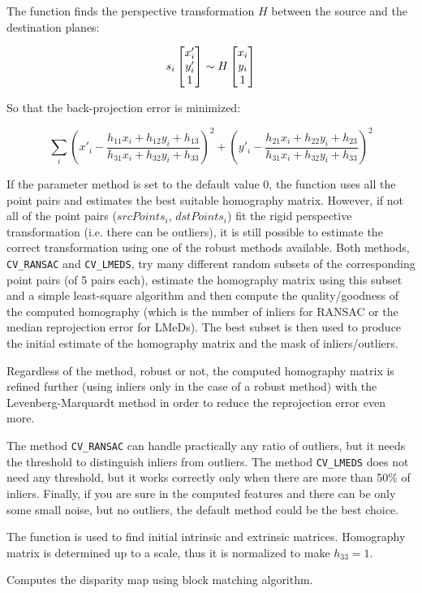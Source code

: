 The function finds the perspective transformation $H$ between the source and the destination planes:

\[
s_i \begin{bmatrix} x'_i\\ y'_i\\ 1 \end{bmatrix} \sim H \begin{bmatrix} x_i\\ y_i\\ 1 \end{bmatrix}
\]

So that the back-projection error is minimized:

\[
\sum_i
\left( x'_i-\frac{h_{11} x_i + h_{12} y_i + h_{13}}{h_{31} x_i + h_{32} y_i + h_{33}} \right)^2+
\left( y'_i-\frac{h_{21} x_i + h_{22} y_i + h_{23}}{h_{31} x_i + h_{32} y_i + h_{33}} \right)^2
\]

If the parameter method is set to the default value 0, the function
uses all the point pairs and estimates the best suitable homography
matrix. However, if not all of the point pairs ($srcPoints_i$,
$dstPoints_i$) fit the rigid perspective transformation (i.e. there
can be outliers), it is still possible to estimate the correct
transformation using one of the robust methods available. Both
methods, \texttt{CV\_RANSAC} and \texttt{CV\_LMEDS}, try many different random subsets
of the corresponding point pairs (of 5 pairs each), estimate
the homography matrix using this subset and a simple least-square
algorithm and then compute the quality/goodness of the computed homography
(which is the number of inliers for RANSAC or the median reprojection
error for LMeDs). The best subset is then used to produce the initial
estimate of the homography matrix and the mask of inliers/outliers.

Regardless of the method, robust or not, the computed homography
matrix is refined further (using inliers only in the case of a robust
method) with the Levenberg-Marquardt method in order to reduce the
reprojection error even more.

The method \texttt{CV\_RANSAC} can handle practically any ratio of outliers,
but it needs the threshold to distinguish inliers from outliers.
The method \texttt{CV\_LMEDS} does not need any threshold, but it works
correctly only when there are more than 50\% of inliers. Finally,
if you are sure in the computed features and there can be only some
small noise, but no outliers, the default method could be the best
choice.

The function is used to find initial intrinsic and extrinsic matrices.
Homography matrix is determined up to a scale, thus it is normalized
to make $h_{33} =1$.

Computes the disparity map using block matching algorithm.


